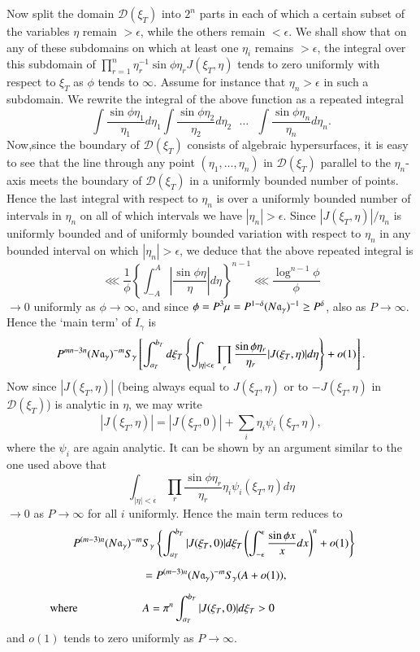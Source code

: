 Now split the domain $\mathscr{D}(\xi_T)$ into $2^n$ parts in each of which a certain subset of the variables $\eta$ remain $> \epsilon$, while the others remain $< \epsilon$. We shall show that on any of  these subdomains on which at least one $\eta_i$ remains $>\epsilon$, the integral over this subdomain of $\prod\limits^n_{r=1} \eta^{-1}_r \sin \phi \eta_r J (\xi_T, \eta)$ tends to zero uniformly with respect to $\xi_{T}$ as $\phi$ tends to $\infty$. Assume for instance that $\eta_n > \epsilon$ in such a subdomain. We rewrite the integral of the above function as a repeated integral
$$
\int\frac{\sin \phi \eta_1}{\eta_1} d \eta_1 \int \frac{\sin \phi \eta_2}{\eta_2} d \eta_2 ~~~\ldots~~~ \int \frac{\sin \phi \eta_n}{\eta_n} d \eta_n.
$$
Now,\pageoriginale  since the boundary of $\mathscr{D}(\xi_T)$ consists of algebraic hypersurfaces, it is easy to see that the line through any point $(\eta_1, \ldots, \eta_n)$ in $\mathscr{D} (\xi_T)$ parallel to the $\eta_n$-axis meets the boundary of $\mathscr{D} (\xi_T)$ in a uniformly bounded number of points. Hence the last integral with respect to $\eta_n$ is over a uniformly bounded number of intervals in $\eta_n$ on all of which intervals we have $|\eta_n| > \epsilon$. Since $|J (\xi_T, \eta)| /\eta_n$ is uniformly bounded and of uniformly bounded variation with respect to $\eta_n$ in any bounded interval on which $|\eta_n| > \epsilon$, we deduce that the above repeated integral is
$$
\lll \frac{1}{\phi} \left\{\int^A_{-A} \left|\dfrac{\sin \phi \eta}{\eta} \right| d\eta \right\}^{n-1} \lll \frac{\log^{n-1} \phi}{\phi}
$$
$\to 0$ uniformly as $\phi \to \infty$, and since $\phi = P^3 \mu = P^{1-\delta} (N \mathfrak{a}_\gamma)^{-1} \geq P^\delta$, also as $P\to \infty$. Hence the `main term' of $I_\gamma$ is
{\fontsize{10}{11}\selectfont
$$
P^{mn - 3 n} (N\mathfrak{a}_\gamma)^{-m} S_\gamma \left[\int^{b_T}_{a_T} d \xi_T \left\{ \int_{|\eta| < \epsilon} \prod\limits_r \dfrac{\sin \phi \eta_r}{\eta_r} |J(\xi_{T}, \eta)| d\eta\right\} +o(1) \right].
$$}
Now since $|J(\xi_T, \eta)|$ (being always equal to $J(\xi_T, \eta)$ or to $-J(\xi_T, \eta)$ in $\mathscr{D}(\xi_T)$) is analytic in $\eta$, we may write
$$
|J (\xi_T, \eta)| = |J (\xi_T, 0)| + \sum\limits_i \eta_i \psi_i (\xi_T, \eta),
$$
where the $\psi_i$ are again analytic. It can be shown by an argument similar to the one used above that
$$
\int_{|\eta|<\epsilon} \prod\limits_r \frac{\sin \phi \eta_r}{\eta_r} \eta_i \psi_i (\xi_T,\eta) d\eta
$$
$\to 0$ as $P\to \infty$ for all $i$ uniformly. Hence the main term reduces to 
\begin{align*}
P^{(m-3)n} (N\fa_\gamma)^{-m} & S_\gamma \left\{\int^{b_T}_{a_T} |J(\xi_T, 0)| d \xi_T \left( \int^\epsilon_{-\epsilon} \frac{\sin\phi x}{x} dx\right)^n + o (1) \right\}\\[0.2cm]
& = P^{(m-3)n} (N\fa_\gamma)^{-m} S_\gamma (A + o(1)),\\[0.2cm]
\text{where} \hspace{2cm} & A = \pi^n \int^{b_T}_{a_T} |J (\xi_T, 0)| d \xi_T > 0 \hspace{3cm}
\end{align*}
and $o(1)$ tends to zero uniformly as $P \to \infty$.

